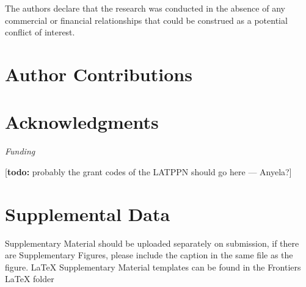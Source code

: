 \documentclass{frontiersSCNS} %
\newcommand{\todo}[1]{
  \rule{0pt}{0pt}\marginpar{{\color{blue}\rule{1ex}{1ex}}}
  {[\textbf{\color{blue}todo:} #1]}}
\begin{document}
The authors declare that the research was conducted in the absence of
any commercial or financial relationships that could be construed as a
potential conflict of interest.

\section*{Author Contributions}



\section*{Acknowledgments}


\textit{Funding\textcolon} \todo{probably the grant codes of the
  LATPPN should go here --- Anyela?}

\section*{Supplemental Data}
Supplementary Material should be uploaded separately on submission, if there are Supplementary Figures, please include the caption in the same file as the figure. LaTeX Supplementary Material templates can be found in the Frontiers LaTeX folder




\end{document}
